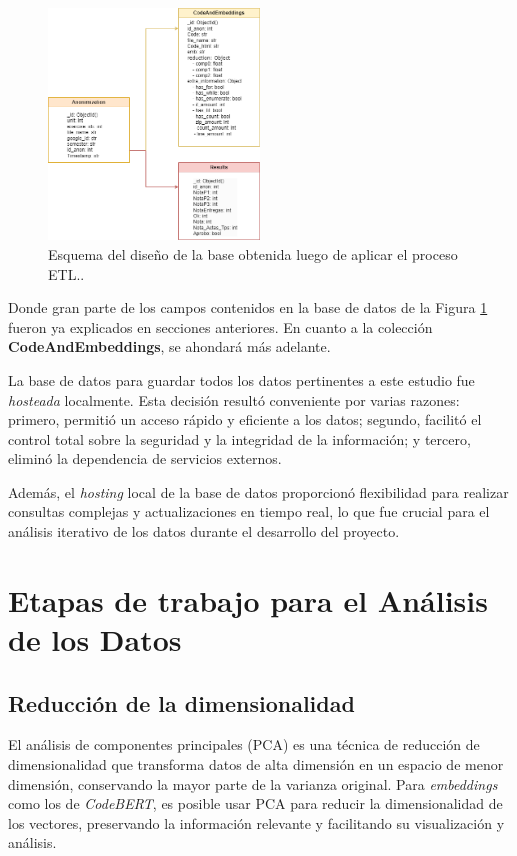 \documentclass[11pt,a4paper,twoside,openany]{tesis}
\begin{document}
\begin{figure}[H]
    \centering
    \includegraphics[width=0.5\textwidth]{imagenes/diagrama-base.png}
    \caption{Esquema del diseño de la base obtenida luego de aplicar el proceso ETL..}
    \label{diagrama-base}
\end{figure}

Donde gran parte de los campos contenidos en la base de datos de la Figura  \ref{diagrama-base} fueron ya explicados en secciones anteriores. En cuanto a la colección \textbf{CodeAndEmbeddings}, se ahondará más adelante.

La base de datos para guardar todos los datos pertinentes a este estudio fue \emph{hosteada} localmente. Esta decisión resultó conveniente por varias razones: primero, permitió un acceso rápido y eficiente a los datos; segundo, facilitó el control total sobre la seguridad y la integridad de la información; y tercero, eliminó la dependencia de servicios externos.

Además, el \emph{hosting} local de la base de datos proporcionó flexibilidad para realizar consultas complejas y actualizaciones en tiempo real, lo que fue crucial para el análisis iterativo de los datos durante el desarrollo del proyecto.

\section{Etapas de trabajo para el Análisis de los Datos}

\subsection{Reducción de la dimensionalidad}

El análisis de componentes principales (PCA) es una técnica de reducción de dimensionalidad que transforma datos de alta dimensión en un espacio de menor dimensión, conservando la mayor parte de la varianza original. Para \emph{embeddings} como los de \emph{CodeBERT}, es posible usar PCA para reducir la dimensionalidad de los vectores, preservando la información relevante y facilitando su visualización y análisis\cite{pca-musil}.
\end{document}
